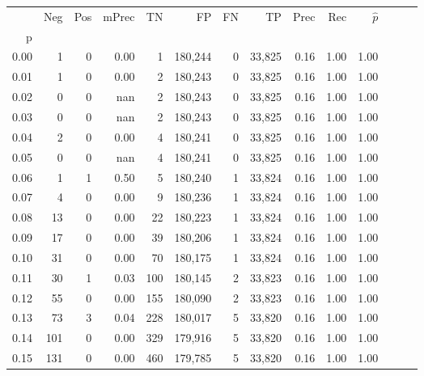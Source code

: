 \begin{tabular}{rrrrrrrrrrrrrr}
\toprule
{} &    Neg &    Pos & mPrec &       TN &       FP &      FN &      TP &  Prec &   Rec & $\hat{p}$ \\
p    &        &        &       &          &          &         &         &       &       &           \\
\midrule
0.00 &      1 &      0 &  0.00 &        1 &  180,244 &       0 &  33,825 &  0.16 &  1.00 &      1.00 \\
0.01 &      1 &      0 &  0.00 &        2 &  180,243 &       0 &  33,825 &  0.16 &  1.00 &      1.00 \\
0.02 &      0 &      0 &   nan &        2 &  180,243 &       0 &  33,825 &  0.16 &  1.00 &      1.00 \\
0.03 &      0 &      0 &   nan &        2 &  180,243 &       0 &  33,825 &  0.16 &  1.00 &      1.00 \\
0.04 &      2 &      0 &  0.00 &        4 &  180,241 &       0 &  33,825 &  0.16 &  1.00 &      1.00 \\
0.05 &      0 &      0 &   nan &        4 &  180,241 &       0 &  33,825 &  0.16 &  1.00 &      1.00 \\
0.06 &      1 &      1 &  0.50 &        5 &  180,240 &       1 &  33,824 &  0.16 &  1.00 &      1.00 \\
0.07 &      4 &      0 &  0.00 &        9 &  180,236 &       1 &  33,824 &  0.16 &  1.00 &      1.00 \\
0.08 &     13 &      0 &  0.00 &       22 &  180,223 &       1 &  33,824 &  0.16 &  1.00 &      1.00 \\
0.09 &     17 &      0 &  0.00 &       39 &  180,206 &       1 &  33,824 &  0.16 &  1.00 &      1.00 \\
0.10 &     31 &      0 &  0.00 &       70 &  180,175 &       1 &  33,824 &  0.16 &  1.00 &      1.00 \\
0.11 &     30 &      1 &  0.03 &      100 &  180,145 &       2 &  33,823 &  0.16 &  1.00 &      1.00 \\
0.12 &     55 &      0 &  0.00 &      155 &  180,090 &       2 &  33,823 &  0.16 &  1.00 &      1.00 \\
0.13 &     73 &      3 &  0.04 &      228 &  180,017 &       5 &  33,820 &  0.16 &  1.00 &      1.00 \\
0.14 &    101 &      0 &  0.00 &      329 &  179,916 &       5 &  33,820 &  0.16 &  1.00 &      1.00 \\
0.15 &    131 &      0 &  0.00 &      460 &  179,785 &       5 &  33,820 &  0.16 &  1.00 &      1.00 \\

\end{tabular}
